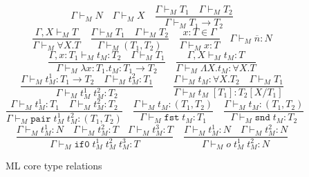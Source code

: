 \begin{figure}
\[
\Gamma\vdash_{M}N
\quad
\Gamma\vdash_{M}X
\quad
\frac{\Gamma\vdash_{M}T_{1}\quad\Gamma\vdash_{M}T_{2}}{\Gamma\vdash_{M}T_{1}\rightarrow T_{2}}
\]
\[
\frac{\Gamma ,X\vdash_{M}T}{\Gamma\vdash_{M}\forall X.T}
\quad
\frac{\Gamma\vdash_{M}T_{1}\quad\Gamma\vdash_{M}T_{2}}{\Gamma\vdash_{M}(T_{1},T_{2})}
\quad
\frac{x:T\in\Gamma}{\Gamma\vdash_{M}x:T}
\quad
\Gamma\vdash_{M}\overline{n}:N
\]
\[
\frac{\Gamma,x:T_{1}\vdash_{M}t_{M}:T_{2}\quad\Gamma\vdash_{M}T_{1}}{\Gamma\vdash_{M}\lambda x:T_{1}.t_{M}:T_{1}\rightarrow T_{2}}
\quad
\frac{\Gamma,X\vdash_{M}t_{M}:T}{\Gamma\vdash_{M}\Lambda X.t_{M}:\forall X.T}
\]
\[
\frac{\Gamma\vdash_{M}t_{M}^{1}:T_{1}\rightarrow T_{2}\quad\Gamma\vdash_{M}t_{M}^{2}:T_{1}}{\Gamma\vdash_{M}t_{M}^{1}\;t_{M}^{2}:T_{2}}
\quad
\quad
\frac{\Gamma\vdash_{M}t_{M}:\forall X.T_{2}\quad\Gamma\vdash_{M}T_{1}}{\Gamma\vdash_{M}t_{M}\;[T_{1}]:T_{2}[X/T_{1}]}
\]
\[
\frac{\Gamma\vdash_{M}t_{M}^{1}:T_{1}\quad\Gamma\vdash_{M}t_{M}^{2}:T_{2}}{\Gamma\vdash_{M}\mathtt{pair}\;t_{M}^{1}\;t_{M}^{2}:(T_{1},T_{2})}
\quad
\frac{\Gamma\vdash_{M}t_{M}:(T_{1},T_{2})}{\Gamma\vdash_{M}\mathtt{fst}\;t_{M}:T_{1}}
\quad
\frac{\Gamma\vdash_{M}t_{M}:(T_{1},T_{2})}{\Gamma\vdash_{M}\mathtt{snd}\;t_{M}:T_{2}}
\]
\[
\frac{\Gamma\vdash_{M}t_{M}^{1}:N\quad\Gamma\vdash_{M}t_{M}^{2}:T\quad\Gamma\vdash_{M}t_{M}^{3}:T}{\Gamma\vdash_{M}\mathtt{if0}\;t_{M}^{1}\;t_{M}^{2}\;t_{M}^{3}:T}
\quad
\frac{\Gamma\vdash_{M}t_{M}^{1}:N\quad\Gamma\vdash_{M}t_{M}^{2}:N}{\Gamma\vdash_{M}o\;t_{M}^{1}\;t_{M}^{2}:N}
\]
\caption{ML core type relations}
\label{mctr}
\end{figure}
